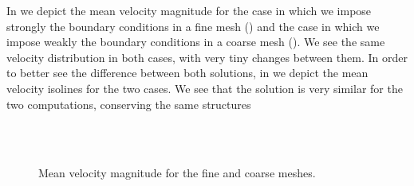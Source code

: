In  we depict the mean velocity magnitude for the case in which we impose strongly the boundary conditions in a fine mesh () and the case in which we impose weakly the boundary conditions in a coarse mesh (). We see the same velocity distribution in both cases, with very tiny changes between them. In order to better see the difference between both solutions, in  we depict the mean velocity isolines for the two cases. We see that the solution is very similar for the two computations, conserving the same structures 
\begin{figure}[h!]
  \centering
  \\
  \\
  \caption{Mean velocity magnitude for the fine and coarse meshes.}
  \label{fig-NACA_mean_velo}
\end{figure}
